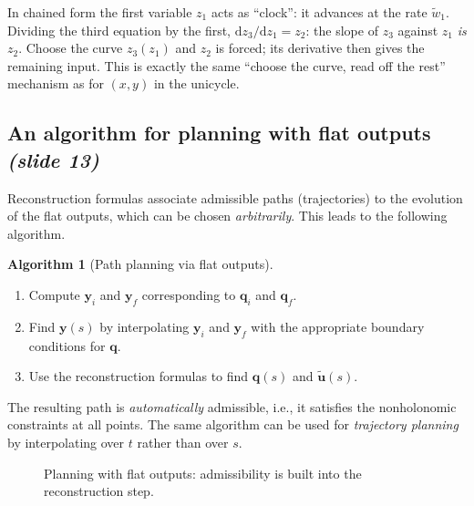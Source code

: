 \documentclass[11pt,a4paper]{article}
\newcommand{\q}{\boldsymbol{q}}
\newcommand{\qi}{\boldsymbol{q}_i}
\newcommand{\qf}{\boldsymbol{q}_f}
\newcommand{\ut}{\tilde{\boldsymbol{u}}}
\newcommand{\wwt}{\tilde w}
\newcommand{\dd}{\mathrm{d}}
\theoremstyle{definition}
\newtheorem{algorithm}[definition]{Algorithm}
\theoremstyle{plain}
\theoremstyle{remark}
\begin{document}
\begin{intuition}
In chained form the first variable $z_1$ acts as ``clock'': it advances at the rate $\wwt_1$. Dividing the third equation by
the first, $\dd z_3/\dd z_1=z_2$: the slope of $z_3$ against $z_1$ \emph{is} $z_2$. Choose the curve $z_3(z_1)$ and
$z_2$ is forced; its derivative then gives the remaining input. This is exactly the same ``choose the curve, read off the rest''
mechanism as for $(x,y)$ in the unicycle.
\end{intuition}

\subsection{An algorithm for planning with flat outputs \emph{(slide 13)}}

Reconstruction formulas associate admissible paths (trajectories) to the evolution of the flat outputs, which can be chosen
\emph{arbitrarily}. This leads to the following algorithm.

\begin{algorithm}[Path planning via flat outputs]\label{alg:flat}
\begin{enumerate}[nosep,label=\arabic*.]
\item Compute $\boldsymbol y_i$ and $\boldsymbol y_f$ corresponding to $\qi$ and $\qf$.
\item Find $\boldsymbol y(s)$ by interpolating $\boldsymbol y_i$ and $\boldsymbol y_f$ with the appropriate boundary conditions for $\q$.
\item Use the reconstruction formulas to find $\q(s)$ and $\ut(s)$.
\end{enumerate}
\end{algorithm}

The resulting path is \emph{automatically} admissible, i.e., it satisfies the nonholonomic constraints at all points. The same
algorithm can be used for \emph{trajectory planning} by interpolating over $t$ rather than over $s$.

\begin{figure}[h]
\centering
{}
\caption{Planning with flat outputs: admissibility is built into the reconstruction step.}
\end{figure}
\end{document}
